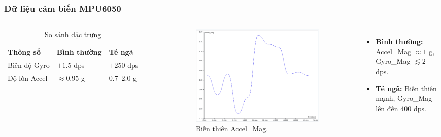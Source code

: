 \begin{frame}[t]
\frametitle{Dữ liệu cảm biến MPU6050}
\begin{columns}[T]
    \begin{table}
        \caption{So sánh đặc trưng}
        \centering
        \footnotesize
        \begin{tabularx}{\textwidth}{|l|X|X|}
            \hline
            \textbf{Thông số} & \textbf{Bình thường} & \textbf{Té ngã} \\
            \hline
            Biên độ Gyro & $\pm 1.5$ dps & $\pm 250$ dps \\
            \hline
            Độ lớn Accel & $\approx 0.95$ g & 0.7--2.0 g \\
            \hline
        \end{tabularx}
    \end{table}
    \begin{figure}
        \centering
        \includegraphics[width=0.9\textwidth]{images/accel_time.png}
        \caption{Biến thiên Accel\_Mag.}
        \label{fig:accel_time}
    \end{figure}
    \begin{itemize}
        \item \textbf{Bình thường:} Accel\_Mag $\approx 1$ g, Gyro\_Mag $\lesssim 2$ dps.
        \item \textbf{Té ngã:} Biến thiên mạnh, Gyro\_Mag lên đến 400 dps.
    \end{itemize}
\end{columns}
\end{frame}

